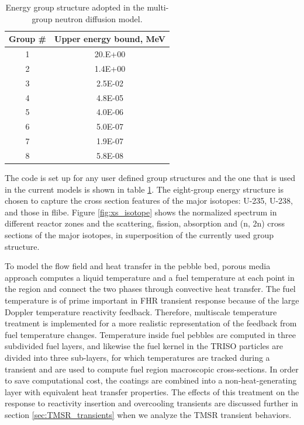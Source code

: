 \documentclass{elsarticle}
\begin{document}
\begin{table}
\caption{Energy group structure adopted in the multi-group neutron diffusion model.}
  \centering
  \begin{tabular}{cc}
  Group \# & Upper energy bound, MeV\\
  \hline
  1 & 20.E+00\\
  2 & 1.4E+00\\
  3 & 2.5E-02\\
  4 & 4.8E-05\\
  5 & 4.0E-06\\
  6 & 5.0E-07\\
  7 & 1.9E-07\\
  8 & 5.8E-08\\
  \hline
  \end{tabular}
  \label{tab:egroup}
\end{table}




The code is set up for any user defined group structures and the one that is used in the current models is shown in table \ref{tab:egroup}. The eight-group energy structure is chosen to capture the cross section features of the major isotopes: U-235, U-238, and those in flibe. Figure \ref{fig:xs_isotope} shows the normalized spectrum in different reactor zones and the scattering, fission, absorption and (n, 2n) cross sections of the major isotopes, in superposition of the currently used group structure. 

To model the flow field and heat transfer in the pebble bed, porous media approach computes a liquid temperature and a fuel temperature at each point in the region and connect the two phases through convective heat transfer. The fuel temperature is of prime important in FHR transient response because of the large Doppler temperature reactivity feedback. Therefore, multiscale temperature treatment is implemented for a more realistic representation of the feedback from fuel temperature changes. 
Temperature inside fuel pebbles are computed in three subdivided fuel layers, and likewise the fuel kernel in the TRISO particles are divided into three sub-layers, for which temperatures are tracked during a transient and are used to compute fuel region macroscopic cross-sections. In order to save computational cost, the coatings are combined into a non-heat-generating layer with equivalent heat transfer properties. The effects of this treatment on the response to reactivity insertion and overcooling transients are discussed further in section \ref{sec:TMSR_transients} when we analyze the TMSR transient behaviors.
\end{document}
